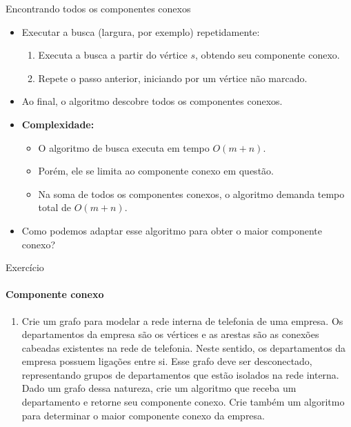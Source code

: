 \begin{frame}{Encontrando todos os componentes conexos}
	
	\begin{itemize}
		\item Executar a busca (largura, por exemplo) repetidamente:
		\begin{enumerate}
			\item Executa a busca a partir do vértice $s$, obtendo seu componente conexo.
			\item Repete o passo anterior, iniciando por um vértice não marcado.
		\end{enumerate}
		\item Ao final, o algoritmo descobre todos os componentes conexos.
		
		\pause
		\medskip
		\item \textbf{Complexidade:}
		\begin{itemize}
			\item O algoritmo de busca executa em tempo $O(m + n)$.
			\item Porém, ele se limita ao componente conexo em questão.
			\item Na soma de todos os componentes conexos, o algoritmo demanda tempo total de $O(m + n)$.
		\end{itemize}
	
		\pause
		\medskip
		\item Como podemos adaptar esse algoritmo para obter o maior componente conexo?
	\end{itemize}
\end{frame}



\begin{frame}{Exercício}
	\framesubtitle{Componente conexo}
	
	\begin{enumerate}
		\item Crie um grafo para modelar a rede interna de telefonia de uma empresa. Os departamentos da empresa são os vértices e as arestas são as conexões cabeadas existentes na rede de telefonia. Neste sentido, os departamentos da empresa possuem ligações entre si. Esse grafo deve ser desconectado, representando grupos de departamentos que estão isolados na rede interna. Dado um grafo dessa natureza, crie um algoritmo que receba um departamento e retorne seu componente conexo. Crie também um algoritmo para determinar o maior componente conexo da empresa.
	\end{enumerate}
\end{frame}



